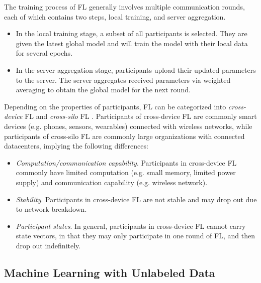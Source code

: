 \documentclass[11pt]{article}
\begin{document}
The training process of FL generally involves multiple communication rounds, each of which contains two steps, local training, and server aggregation. 
\begin{itemize}
    \item In the local training stage, a subset of all participants is selected. They are given the latest global model and will train the model with their local data for several epochs. 

    \item In the server aggregation stage, participants upload their updated parameters to the server. The server aggregates received parameters via weighted averaging to obtain the global model for the next round. 
\end{itemize}

Depending on the properties of participants, FL can be categorized into \textit{cross-device} FL and \textit{cross-silo} FL \cite{kairouz2021advances}. Participants of cross-device FL are commonly smart devices (e.g. phones, sensors, wearables) connected with wireless networks, while participants of cross-silo FL are commonly large organizations with connected datacenters, implying the following differences: 
\begin{itemize}
    \item \textit{Computation/communication capability}. Participants in cross-device FL commonly have limited computation (e.g. small memory, limited power supply) and communication capability (e.g. wireless network). 
    \item \textit{Stability}. Participants in cross-device FL are not stable and may drop out due to network breakdown. 
    \item \textit{Participant states}. In general, participants in cross-device FL cannot carry state vectors, in that they may only participate in one round of FL, and then drop out indefinitely. 
\end{itemize}


\subsection{Machine Learning with Unlabeled Data}
\end{document}
